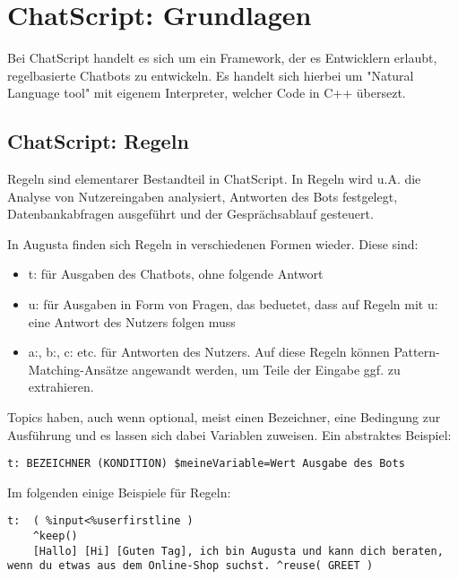 \chapter{ChatScript: Grundlagen}
\label{sec:ChatScript: Grundlagen}

Bei ChatScript handelt es sich um ein Framework, der es Entwicklern erlaubt, regelbasierte Chatbots zu entwickeln. Es handelt sich hierbei um "Natural Language tool" mit eigenem Interpreter, welcher Code in C++ übersezt. 

\section{ChatScript: Regeln}
\label{sec:ChatScript: Regeln}

Regeln sind elementarer Bestandteil in ChatScript. In Regeln wird u.A. die Analyse von Nutzereingaben analysiert, Antworten des Bots festgelegt, Datenbankabfragen ausgeführt und der Gesprächsablauf gesteuert.  

In Augusta finden sich Regeln in verschiedenen Formen wieder. Diese sind: 

\begin{itemize}
\item t: für Ausgaben des Chatbots, ohne folgende Antwort 
\item u: für Ausgaben in Form von Fragen, das beduetet, dass auf Regeln mit u: eine Antwort des Nutzers folgen muss 
\item a:, b:, c: etc. für Antworten des Nutzers. Auf diese Regeln können Pattern-Matching-Ansätze angewandt werden, um Teile der Eingabe ggf. zu extrahieren.
\end{itemize}

Topics haben, auch wenn optional, meist einen Bezeichner, eine Bedingung zur Ausführung und es lassen sich dabei Variablen zuweisen. Ein abstraktes Beispiel:

\begin{lstlisting}[caption={Syntax für Regeln}]
t: BEZEICHNER (KONDITION) $meineVariable=Wert Ausgabe des Bots
\end{lstlisting}

Im folgenden einige Beispiele für Regeln:

\begin{lstlisting}[caption={Beispiel für t:}]
t:  ( %input<%userfirstline )
    ^keep()
    [Hallo] [Hi] [Guten Tag], ich bin Augusta und kann dich beraten, wenn du etwas aus dem Online-Shop suchst. ^reuse( GREET )
\end{lstlisting}

